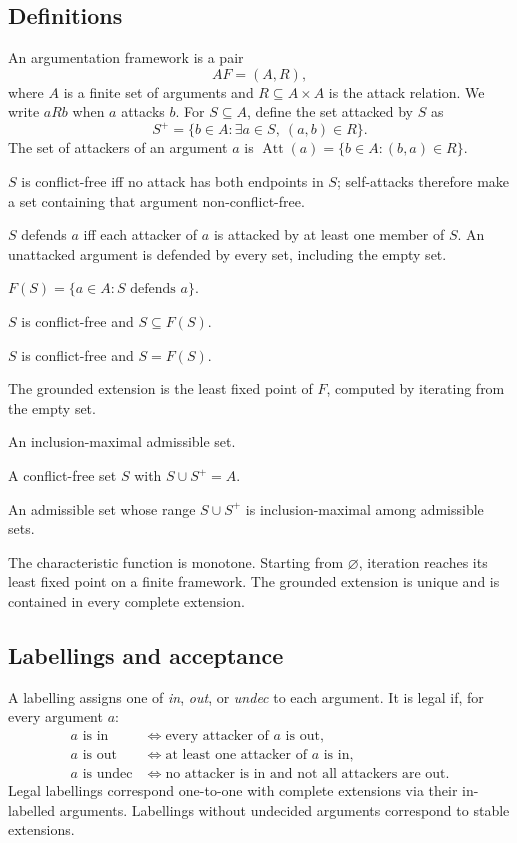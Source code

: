\documentclass[11pt,a4paper]{article}
\newcommand{\AF}{\mathit{AF}}
\begin{document}
\subsection{Definitions}
An argumentation framework is a pair
\[
\AF=(A,R),
\]
where $A$ is a finite set of arguments and $R\subseteq A\times A$ is the attack relation. We write $aRb$ when $a$ attacks $b$. For $S\subseteq A$, define the set attacked by $S$ as
\[
S^+=\{b\in A:\exists a\in S,\ (a,b)\in R\}.
\]
The set of attackers of an argument $a$ is $\operatorname{Att}(a)=\{b\in A:(b,a)\in R\}$.

\begin{description}[style=nextline,leftmargin=2.6cm,labelwidth=2.4cm]
\item[Conflict-free] $S$ is conflict-free iff no attack has both endpoints in $S$; self-attacks therefore make a set containing that argument non-conflict-free.
\item[Defence] $S$ defends $a$ iff each attacker of $a$ is attacked by at least one member of $S$. An unattacked argument is defended by every set, including the empty set.
\item[Characteristic function] $F(S)=\{a\in A:S\text{ defends }a\}$.
\item[Admissible] $S$ is conflict-free and $S\subseteq F(S)$.
\item[Complete] $S$ is conflict-free and $S=F(S)$.
\item[Grounded] The grounded extension is the least fixed point of $F$, computed by iterating from the empty set.
\item[Preferred] An inclusion-maximal admissible set.
\item[Stable] A conflict-free set $S$ with $S\cup S^+=A$.
\item[Semi-stable] An admissible set whose range $S\cup S^+$ is inclusion-maximal among admissible sets.
\end{description}

The characteristic function is monotone. Starting from $\varnothing$, iteration reaches its least fixed point on a finite framework. The grounded extension is unique and is contained in every complete extension.

\subsection{Labellings and acceptance}
A labelling assigns one of \emph{in}, \emph{out}, or \emph{undec} to each argument. It is legal if, for every argument $a$:
\[
\begin{aligned}
a\text{ is in} &\iff \text{every attacker of }a\text{ is out},\\
a\text{ is out} &\iff \text{at least one attacker of }a\text{ is in},\\
a\text{ is undec} &\iff \text{no attacker is in and not all attackers are out}.
\end{aligned}
\]
Legal labellings correspond one-to-one with complete extensions via their in-labelled arguments. Labellings without undecided arguments correspond to stable extensions.
\end{document}
